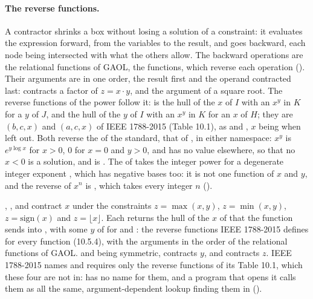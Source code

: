 \documentclass[12pt,a4paper,twoside,openright]{book}
\begin{document}
\paragraph{The reverse functions.}
A contractor shrinks a box without losing a solution of a constraint: it
evaluates the expression forward, from the variables to the result, and goes
backward, each node being intersected with what the others allow. The
backward operations are the relational functions of GAOL, the 
functions, which reverse each operation ().
Their arguments are in one order, the result first and the operand contracted
last:  contracts a factor of $z=x\cdot y$, and
 the argument of a square root. The reverse functions of
the power follow it:  is the hull of the $x$ of $I$
with an $x^y$ in $K$ for a $y$ of $J$, and 
the hull of the $y$ of $I$ with an $x^y$ in $K$ for an $x$ of $H$; they are
$(b,c,x)$ and $(a,c,x)$ of IEEE 1788-2015 (Table
10.1), as  and , $x$
being \itv{-\infty}{+\infty} when left out.\newinvfive{} Both reverse the
 of the standard, that of , in either
namespace: $x^y$ is $e^{y\log x}$ for $x>0$, $0$ for $x=0$ and $y>0$, and has
no value elsewhere, so that no $x<0$ is a solution, and
 is . The  of
 takes the integer power for a degenerate integer exponent
, which has negative bases too: it is not one function of $x$ and
$y$, and the reverse of $x^n$ is , which takes
every integer $n$ ().

\medskip
{}, ,  and
 contract $x$ under the constraints $z=\max(x,y)$,
$z=\min(x,y)$, $z=\mathrm{sign}(x)$ and $z=\lfloor x\rfloor$.\newinvfive{}
Each returns the hull of the $x$ of  that the function sends into
, with some $y$ of  for  and : the reverse
functions IEEE 1788-2015 defines for every function (10.5.4), with the
arguments in the order of the relational functions of GAOL.  and
 being symmetric,  contracts $y$, and
 contracts $z$. IEEE 1788-2015 names and requires only
the reverse functions of its Table 10.1, which these four are not in:
 has no name for them, and a program that opens it calls
them as  all the same, argument-dependent lookup
finding them in  ().
\end{document}

